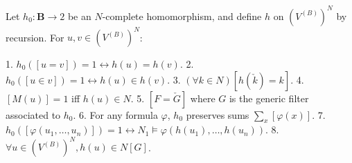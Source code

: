 Let $h_0: \mathbf{B} \to 2$ be an $N$-complete homomorphism, and define $h$ on $(V^{(B)})^N$ by recursion. For $u, v \in (V^{(B)})^N$:

1. $h_0([u = v]) = 1 \leftrightarrow h(u) = h(v)$.
2. $h_0([u \in v]) = 1 \leftrightarrow h(u) \in h(v)$.
3. $(\forall k \in N)[h(\check{k}) = k]$.
4. $[M(u)] = 1$ iff $h(u) \in N$.
5. $[F = \check{G}]$ where $G$ is the generic filter associated to $h_0$.
6. For any formula $\varphi$, $h_0$ preserves sums $\sum_{x} [\varphi(x)]$.
7. $h_0([\varphi(u_1,\ldots,u_n)]) = 1 \leftrightarrow N_1 \models \varphi(h(u_1),\ldots,h(u_n))$.
8. $\forall u \in (V^{(B)})^N, h(u) \in N[G]$.
